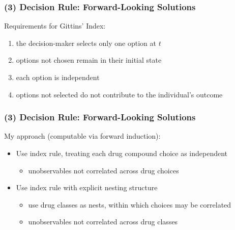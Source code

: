 \documentclass[aspectratio=169,11pt]{beamer}
\begin{document}
\begin{frame}[label=DYNAM]

\frametitle{(3) Decision Rule: Forward-Looking Solutions}
\small

Requirements for Gittins' Index:

\begin{enumerate}
\item the decision-maker selects only one option at $t$

\item options not chosen remain in their initial state

\item each option is independent

\item options not selected do not contribute to the individual's outcome
\end{enumerate}

\hyperlink{GITTINS}{}
\end{frame}


\begin{frame}
\frametitle{(3) Decision Rule: Forward-Looking Solutions}
\small

My approach (computable via forward induction):

\begin{itemize}
\item Use index rule, treating each drug compound choice as independent

\begin{itemize}
\item unobservables not correlated across drug choices
\end{itemize}

\item Use index rule with explicit nesting structure

\begin{itemize}
\item use drug classes as nests, within which choices may be correlated

\item unobservables not correlated across drug classes
\end{itemize}
\end{itemize}
\end{frame}

\end{document}
